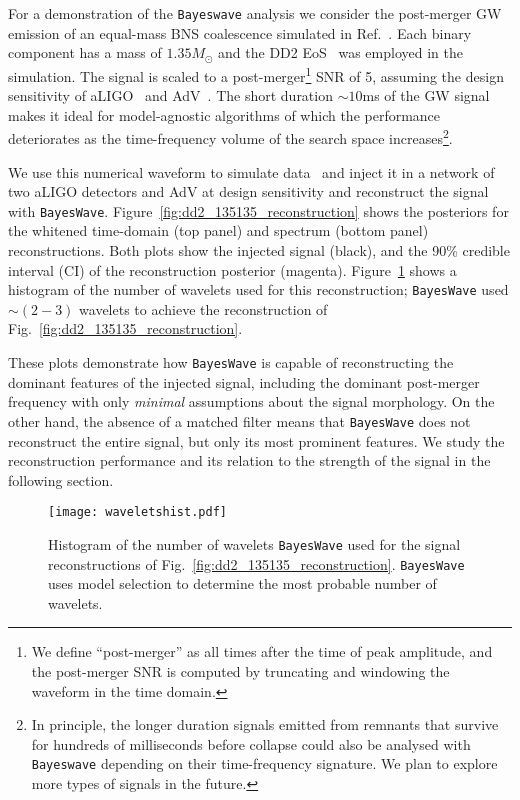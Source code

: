 \documentclass[aps,prd,amsmath,floats,floatfix, twocolumn,
superscriptaddress,nofootinbib,showpacs]{revtex4-1}
\begin{document}
For a demonstration of the {\tt Bayeswave} analysis we consider the post-merger GW emission of an equal-mass BNS coalescence simulated in Ref.~\cite{bauswein:14}. Each binary component has a mass of $1.35M_{\odot}$ and the DD2 EoS~\cite{2010NuPhA.837..210H,2010PhRvC..81a5803T} was employed in the simulation. The signal is scaled to a post-merger\footnote{We define ``post-merger'' as all times after the time of peak amplitude, and the post-merger SNR is computed by truncating and windowing the waveform in the time domain.} SNR of 5, assuming the design sensitivity of aLIGO~\cite{AdvLIGO-noise} and AdV~\cite{TheVirgo:2014hva}. The short duration $\sim 10$ms of the GW signal makes it ideal for model-agnostic algorithms of which the performance deteriorates as the time-frequency volume of the search space increases\footnote{In principle, the longer duration signals emitted from remnants that survive for hundreds of milliseconds before collapse could also be analysed with {\tt Bayeswave} depending on their time-frequency signature. We plan to explore more types of signals in the future.}. 


We use this numerical waveform to simulate data~\cite{Schmidt:2017btt} and inject it in a network of two aLIGO detectors and AdV at design sensitivity and reconstruct the signal with {\tt BayesWave}. Figure~\ref{fig:dd2_135135_reconstruction} shows the posteriors for the whitened time-domain (top panel) and spectrum (bottom panel) reconstructions. Both plots show the injected signal (black), and the 90\% credible interval (CI) of the reconstruction posterior (magenta). Figure~\ref{fig:model_dimensions} shows a histogram of the number of wavelets used for this reconstruction; {\tt BayesWave} used $\sim(2-3)$ wavelets to achieve the reconstruction of Fig.~\ref{fig:dd2_135135_reconstruction}.


These plots demonstrate how {\tt BayesWave} is capable of reconstructing the dominant features of the injected signal, including the dominant post-merger frequency with only \emph{minimal} assumptions about the signal morphology. On the other hand, the absence of a matched filter means that {\tt BayesWave} does not reconstruct the entire signal, but only its most prominent features. We study the reconstruction performance and its relation to the strength of the signal in the following section. 


\begin{figure}[h!]
\texttt{[image: waveletshist.pdf]}
\caption{ \label{fig:model_dimensions} Histogram of the number of wavelets  {\tt BayesWave} used for the signal reconstructions of Fig.~\ref{fig:dd2_135135_reconstruction}. {\tt BayesWave} uses model selection to determine the most probable number of wavelets.}
\end{figure}
\end{document}
